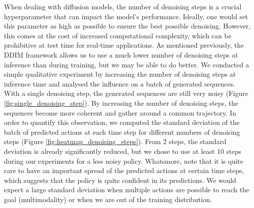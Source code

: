 When dealing with diffusion models, the number of denoising steps is a crucial hyperparameter that can
impact the model's performance. Ideally, one would set this parameter as high as possible to ensure
the best possible denoising. However, this comes at the cost of increased computational complexity, which
can be prohibitive at test time for real-time applications. As mentioned previously, the DDIM framework
allows us to use a much lower number of denoising steps at inference than during training, but we
may be able to do better. We conducted a simple qualitative experiment by increasing the number of
denoising steps at inference time and analysed the influence on a batch of generated sequences. With a
single denoising step, the generated sequences are still very noisy (Figure \ref{fig:single_denoising_step}).
By increasing the number of denoising steps, the sequences become more coherent and gather around a
common trajectory. In order to quantify this observation, we computed the standard deviation of the
batch of predicted actions at each time step for different numbers of denoising steps (Figure
\ref{fig:heatmap_denoising_steps}). From 2 steps, the standard deviation is already significantly reduced,
but we chose to use at least 10 steps during our experiments for a less noisy policy. Whatsmore, note
that it is quite rare to have an important spread of the predicted actions at certain time steps, which
suggests that the policy is quite confident in its predictions. We would expect a large standard deviation
when multiple actions are possible to reach the goal (multimodality) or when we are out of the
training distribution.
